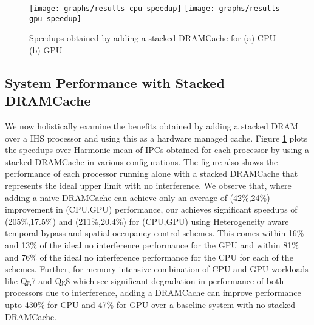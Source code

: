\begin{figure}[!htb]
    \centering
    \texttt{[image: graphs/results-cpu-speedup]}
    \texttt{[image: graphs/results-gpu-speedup]}
    \caption{Speedups obtained by adding a stacked DRAMCache for (a) CPU (b) GPU}
    \label{results-antt-speedup}
\end{figure}

\subsection{System Performance with Stacked DRAMCache}
We now holistically examine the benefits obtained by adding a stacked DRAM over a IHS processor and using this as a hardware managed cache. Figure \ref{results-antt-speedup} plots the speedups over Harmonic mean of IPCs obtained for each processor by using a stacked DRAMCache in various configurations. The figure also shows the performance of each processor running alone with a stacked DRAMCache that represents the ideal upper limit with no interference. 
We observe that, where adding a naive DRAMCache can achieve only an average of (42\%,24\%) improvement in (CPU,GPU) performance, our \cachename achieves significant speedups of (205\%,17.5\%) and (211\%,20.4\%) for (CPU,GPU) using Heterogeneity aware temporal bypass and spatial occupancy control schemes. This comes within 16\% and 13\% of the ideal no interference performance for the GPU and within 81\% and 76\% of the ideal no interference performance for the CPU for each of the schemes. Further, for memory intensive combination of CPU and GPU workloads like Qg7 and Qg8 which see significant degradation in performance of both processors due to interference, adding a DRAMCache can improve performance upto 430\% for CPU and 47\% for GPU over a baseline system with no stacked DRAMCache.